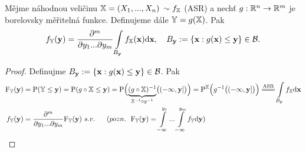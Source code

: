 \begin{theorem}
	Mějme náhodnou veličinu $\mathbb{X}=(X_1,... ,X_n)$ $\sim f_{\mathbb{X}}$ (ASR) a nechť $g:\mathbb{R}^n\to\mathbb{R}^m$ je borelovsky měřitelná funkce. Definujeme dále $\mathbb{Y}=g(\mathbb{X})$. Pak 
	$$f_\mathbb{Y}(\textbf{y})=\frac{\partial^m}{\partial y_1... \partial y_m}\int\limits_{B_\textbf{y}}f_{\mathbb{X}}(\textbf{x})\mathrm{d}\textbf{x},~~~B_\textbf{y}:=\{ \textbf{x}:g(\textbf{x})\leq \textbf{y} \} \in\mathcal{B}.$$
	\begin{proof}Definujme $B_\textbf{y}:=\{ \textbf{x}:g(\textbf{x})\leq \textbf{y} \} \in\mathcal{B}$. Pak
	\[
	\begin{split}
	\FF_\mathbb{Y}(\textbf{y})&=\PP(\mathbb{Y}\leq \textbf{y})=\PP(g\circ \X\leq \textbf{y})=\PP\Bigl(\underbrace{(g \circ \X)^{-1}}_{\X^{-1}\circ g^{-1}}\bigl((-\infty,\textbf{y}] \bigr)\Bigr)=\PEX \Bigl(g^{-1}\bigl((-\infty,\textbf{y}]\bigr)\Bigr) \equal{\text{ASR}}\int\limits_{B_\textbf{y}}\fex \dif\textbf{x} \\ f_\mathbb{Y}(\textbf{y})&=\frac{\partial^m}{\partial y_1... \partial y_m}\FF_\mathbb{Y}(\textbf{y})~s.v.~~~~~(pozn.~~\FF_\mathbb{Y}(\textbf{y})=\int\limits_{-\infty}^{y_1}... \int\limits_{-\infty}^{y_m}f_\mathbb{Y} \dif\textbf{y}) 
	\end{split}
	\]
	\end{proof}
\end{theorem}
